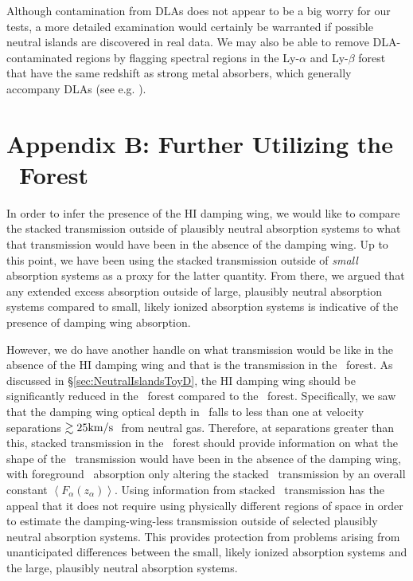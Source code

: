 Although contamination from DLAs does not appear to be a big worry for our tests, a more detailed examination would
certainly be warranted if possible neutral islands are discovered in real data. We may also be able to remove
DLA-contaminated regions by flagging spectral regions in the Ly-$\alpha$ and Ly-$\beta$ forest that have the same redshift
as strong metal absorbers, which generally accompany DLAs (see e.g. \citealt{Wolfe:2005jd}). 


\section*{Appendix B: Further Utilizing the \lyb\ Forest} \label{sec:NeutralIslandsBetaHandle}




In order to infer the presence of the HI damping wing, we would like to compare the stacked transmission outside of plausibly neutral absorption systems to what that transmission would have been in the absence of the damping wing. Up to this point, we have been using the stacked transmission outside of \textit{small} absorption systems as a proxy for the latter quantity. From there, we argued that any extended excess absorption outside of large, plausibly neutral absorption systems compared to small, likely ionized absorption systems is indicative of the presence of damping wing absorption. 


However, we do have another handle on what transmission would be like in the absence of the HI damping wing and that is the transmission in the \lyb\ forest. As discussed in \S\ref{sec:NeutralIslandsToyD}, the HI damping wing should be significantly reduced in the \lyb\ forest compared to the \lya\ forest. Specifically, we saw that the damping wing optical depth in \lyb\ falls to less than one at velocity separations $\gtrsim 25\text{km}/\text{s}\ $ from neutral gas. Therefore, at separations greater than this, stacked transmission in the \lyb\ forest should provide information on what the shape of the \lya\ transmission would have been in the absence of the damping wing, with foreground \lya\ absorption only altering the stacked \lyb\ transmission by an overall constant $\left\langle F_{\alpha}(z_{\alpha}) \right\rangle$. Using information from stacked \lyb\ transmission has the appeal that it does not require using physically different regions of space in order to estimate the damping-wing-less transmission outside of selected plausibly neutral absorption systems. This provides protection from problems arising from unanticipated differences between the small, likely ionized absorption systems and the large, plausibly neutral absorption systems.


